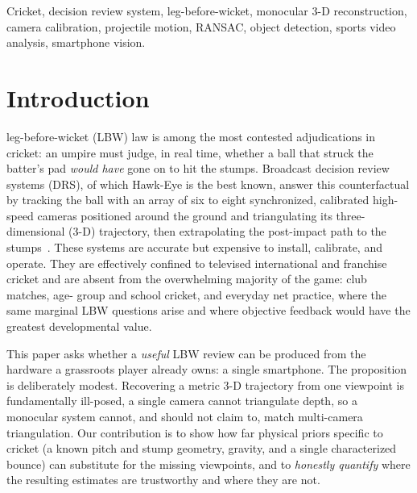 \documentclass[journal]{IEEEtran}
\begin{document}
\begin{IEEEkeywords}
Cricket, decision review system, leg-before-wicket, monocular 3-D
reconstruction, camera calibration, projectile motion, RANSAC, object
detection, sports video analysis, smartphone vision.
\end{IEEEkeywords}

\IEEEpeerreviewmaketitle

\section{Introduction}
 leg-before-wicket (LBW) law is among the most contested
adjudications in cricket: an umpire must judge, in real time, whether a ball
that struck the batter's pad \emph{would have} gone on to hit the stumps.
Broadcast decision review systems (DRS), of which Hawk-Eye is the best known,
answer this counterfactual by tracking the ball with an array of six to eight
synchronized, calibrated high-speed cameras positioned around the ground and
triangulating its three-dimensional (3-D) trajectory, then extrapolating the
post-impact path to the stumps~\cite{owens2003hawkeye,thomas2017cvsports}.
These systems are accurate but expensive to install, calibrate, and operate.
They are effectively confined to televised international and franchise cricket
and are absent from the overwhelming majority of the game: club matches, age-
group and school cricket, and everyday net practice, where the same marginal
LBW questions arise and where objective feedback would have the greatest
developmental value.

This paper asks whether a \emph{useful} LBW review can be produced from the
hardware a grassroots player already owns: a single smartphone. The proposition
is deliberately modest. Recovering a metric 3-D trajectory from one viewpoint is
fundamentally ill-posed, a single camera cannot triangulate depth, so a
monocular system cannot, and should not claim to, match multi-camera
triangulation. Our contribution is to show how far physical priors specific to
cricket (a known pitch and stump geometry, gravity, and a single characterized
bounce) can substitute for the missing viewpoints, and to \emph{honestly
quantify} where the resulting estimates are trustworthy and where they are not.
\end{document}
